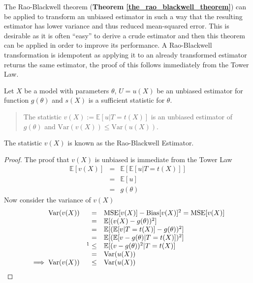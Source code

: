 \documentclass[11pt,a4paper,margin=0]{article}
\newcommand*{\expect}{\mathbb{E}}
\theoremstyle{break}
\begin{document}

  The Rao-Blackwell theorem (\textbf{Theorem \ref{the_rao_blackwell_theorem}}) can be applied to transform an unbiased estimator in such a way that the resulting estimator has lower variance and thus reduced mean-squared error.
   This is desirable as it is often ``easy'' to derive a crude estimator and then this theorem can be applied in order to improve its performance. %
   A Rao-Blackwell transformation is idempotent as applying it to an already transformed estimator returns the same estimator, the proof of this follows immediately from the Tower Law.

  \begin{box_theorem}\label{the_rao_blackwell_theorem}
    Let $X$ be a model with parameters $\theta$, $U=u(X)$ be an unbiased estimator for function $g(\theta)$ and $s(X)$ is a sufficient statistic for $\theta$.
    \begin{quote}
      The statistic $v(X):=\expect[u|T=t(X)]$ is an unbiased estimator of $g(\theta)$ and $\text{Var}(v(X))\leq\text{Var}(u(X))$.
    \end{quote}
    The statistic $v(X)$ is known as the Rao-Blackwell Estimator.
    \cite{rao_blackwell_rao_part,rao_blackwell_blackwell_part}
    \begin{proof}
      The proof that $v(X)$ is unbiased is immediate from the Tower Law
      \[\begin{array}{rcl}
        \expect[v(X)]&=&\expect[\expect[u|T=t(X)]]\\
        &=&\expect[u]\\
        &=&g(\theta)
      \end{array}\]
      Now consider the variance of $v(X)$
      \[\begin{array}{rrl}
        \text{Var}(v(X))&=&\text{MSE}[v(X)]-\text{Bias}[v(X)]^2=\text{MSE}[v(X)]\\
        &=&\expect[(v(X)-g(\theta))^2]\\
        &=&\expect[(\expect[v|T=t(X)]-g(\theta))^2]\\
        &=&\expect[(\expect[v-g(\theta)|T=t(X)])^2]\\
        &\footnotemark\leq&\expect[(v-g(\theta))^2|T=t(X)]\\
        &=&\text{Var}(u(X))\\
        \implies\text{Var}(v(X))&\leq&\text{Var}(u(X))
      \end{array}\]
      \footnotetext{$\text{Var}(X)=\expect[X^2]-\expect[X]^2\implies\expect[X^2]\geq\expect[X]^2$}
    \end{proof}
  \end{box_theorem}
\end{document}
